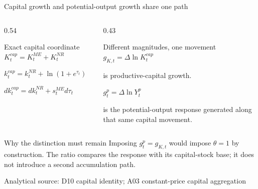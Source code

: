 \documentclass[10pt,aspectratio=169]{beamer}
\newcommand{\sourcefooter}[1]{%
  \par\vfill{\tiny\color{gray!70}Analytical source: #1}\vspace{-0.35em}}
\begin{document}
\begin{frame}{Capital growth and potential-output growth share one path}
  \begin{columns}[T,onlytextwidth]
    \begin{column}{0.54\textwidth}
      \begin{block}{Exact capital coordinate}
        \centering
        $\displaystyle
        K_t^{cap}=K_t^{ME}+K_t^{NR}$

        \vspace{0.4em}
        $\displaystyle
        k_t^{cap}=k_t^{NR}+\ln(1+e^{\tau_t})$

        \vspace{0.4em}
        \Large
        $\displaystyle
        d k_t^{cap}=d k_t^{NR}+s_t^{ME}d\tau_t$
      \end{block}
    \end{column}
    \begin{column}{0.43\textwidth}
      \begin{block}{Different magnitudes, one movement}
        \small
        $\displaystyle g_{K,t}=\Delta\ln K_t^{cap}$

        is productive-capital growth.

        \vspace{0.7em}
        $\displaystyle g_t^p=\Delta\ln Y_t^p$

        is the potential-output response generated along that same capital movement.
      \end{block}
    \end{column}
  \end{columns}
  \begin{alertblock}{Why the distinction must remain}
    Imposing $g_t^p=g_{K,t}$ would impose $\theta=1$ by construction. The ratio compares the response with its capital-stock base; it does not introduce a second accumulation path.
  \end{alertblock}
  \sourcefooter{D10 capital identity; A03 constant-price capital aggregation}
\end{frame}
\end{document}
